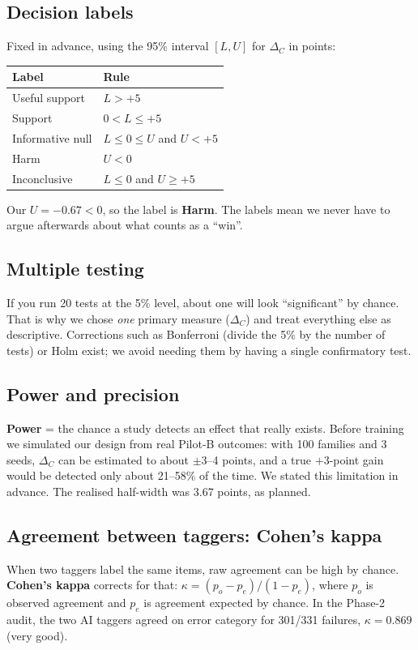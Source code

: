 \documentclass[11pt,a4paper]{article}
\begin{document}
\subsection{Decision labels}
Fixed in advance, using the 95\% interval $[L, U]$ for $\Delta_C$ in points:
\begin{center}\small
\begin{tabular}{@{}ll@{}}\toprule
Label & Rule\\\midrule
Useful support & $L > +5$\\
Support & $0 < L \le +5$\\
Informative null & $L \le 0 \le U$ and $U < +5$\\
Harm & $U < 0$\\
Inconclusive & $L \le 0$ and $U \ge +5$\\\bottomrule
\end{tabular}
\end{center}
Our $U = -0.67 < 0$, so the label is \textbf{Harm}. The labels mean we never have to argue afterwards about what counts as a ``win''.

\subsection{Multiple testing}
If you run 20 tests at the 5\% level, about one will look ``significant'' by chance. That is why we chose \emph{one} primary measure ($\Delta_C$) and treat everything else as descriptive. Corrections such as Bonferroni (divide the 5\% by the number of tests) or Holm exist; we avoid needing them by having a single confirmatory test.

\subsection{Power and precision}
\textbf{Power} = the chance a study detects an effect that really exists. Before training we simulated our design from real Pilot-B outcomes: with 100 families and 3 seeds, $\Delta_C$ can be estimated to about $\pm 3$--4 points, and a true $+3$-point gain would be detected only about 21--58\% of the time. We stated this limitation in advance. The realised half-width was 3.67 points, as planned.

\subsection{Agreement between taggers: Cohen's kappa}
When two taggers label the same items, raw agreement can be high by chance. \textbf{Cohen's kappa} corrects for that:
$\kappa = (p_o - p_e)/(1 - p_e)$, where $p_o$ is observed agreement and $p_e$ is agreement expected by chance. In the Phase-2 audit, the two AI taggers agreed on error category for 301/331 failures, $\kappa = 0.869$ (very good).
\end{document}
